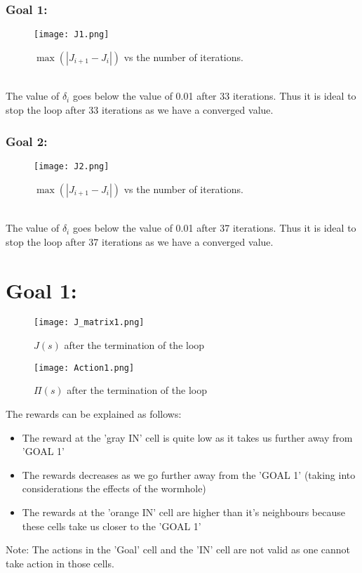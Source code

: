 \documentclass{article}
\begin{document}
\subsubsection{Goal 1:}
  \begin{figure}[h]
 \centering
\texttt{[image: J1.png]}
\caption{$\max(|J_{i+1}-J_{i}|)$ vs the number of iterations.}
\end{figure}\\
The value of $\delta_i$ goes below the value of 0.01 after 33 iterations. Thus it is ideal to stop the loop after 33 iterations as we have a converged value.

 \subsubsection{Goal 2:}
  \begin{figure}[h]
 \centering
\texttt{[image: J2.png]}
\caption{$\max(|J_{i+1}-J_{i}|)$ vs the number of iterations.}
\end{figure}\\
The value of $\delta_i$ goes below the value of 0.01 after 37 iterations. Thus it is ideal to stop the loop after 37 iterations as we have a converged value.


\section{Goal 1:}
 
 \begin{figure}[h]
 \centering
\texttt{[image: J\_matrix1.png]}
\caption{$J(s)$ after the termination of the loop}
\end{figure}

\begin{figure}[h]
 \centering
\texttt{[image: Action1.png]}
\caption{$\Pi(s)$ after the termination of the loop}
\end{figure}
The rewards can be explained as follows:
\begin{itemize}
\item The reward at the 'gray IN' cell is quite low as it takes us further away from 'GOAL 1'
\item The rewards decreases as we go further away from the 'GOAL 1' (taking into considerations the effects of the wormhole)
\item The rewards at the 'orange IN' cell are higher than it's neighbours because these cells take us closer to the 'GOAL 1'
\end{itemize}
Note: The actions in the 'Goal' cell and the 'IN' cell are not valid as one cannot take action in those cells.
\end{document}

